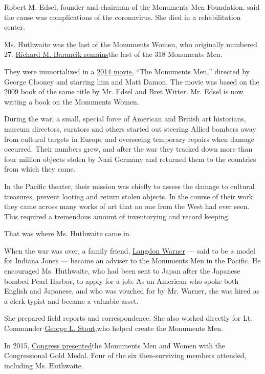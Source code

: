 Robert M. Edsel, founder and chairman of the Monuments Men Foundation,
said the cause was complications of the coronavirus. She died in a
rehabilitation center.

Ms. Huthwaite was the last of the Monuments Women, who originally
numbered 27.
\href{https://www.monumentsmenfoundation.org/barancik-pfc-richard-m}{Richard
M. Barancik remains}the last of the 318 Monuments Men.

They were immortalized in a
\href{https://www.imdb.com/title/tt2177771/}{2014 movie,} ``The
Monuments Men,'' directed by George Clooney and starring him and Matt
Damon. The movie was based on the 2009 book of the same title by Mr.
Edsel and Bret Witter. Mr. Edsel is now writing a book on the Monuments
Women.

During the war, a small, special force of American and British art
historians, museum directors, curators and others started out steering
Allied bombers away from cultural targets in Europe and overseeing
temporary repairs when damage occurred. Their numbers grew, and after
the war they tracked down more than four million objects stolen by Nazi
Germany and returned them to the countries from which they came.

In the Pacific theater, their mission was chiefly to assess the damage
to cultural treasures, prevent looting and return stolen objects. In the
course of their work they came across many works of art that no one from
the West had ever seen. This required a tremendous amount of
inventorying and record keeping.

That was where Ms. Huthwaite came in.

When the war was over, a family friend,
\href{https://www.monumentsmenfoundation.org/warner-langdon}{Langdon
Warner} --- said to be a model for Indiana Jones --- became an adviser
to the Monuments Men in the Pacific. He encouraged Ms. Huthwaite, who
had been sent to Japan after the Japanese bombed Pearl Harbor, to apply
for a job. As an American who spoke both English and Japanese, and who
was vouched for by Mr. Warner, she was hired as a clerk-typist and
became a valuable asset.

She prepared field reports and correspondence. She also worked directly
for Lt. Commander
\href{https://www.monumentsmenfoundation.org/stout-lt-cdr-george-l-usnr}{George
L. Stout,}who helped create the Monuments Men.

In 2015,
\href{https://www.mcclatchydc.com/news/politics-government/congress/article41044539.html}{Congress
presented}the Monuments Men and Women with the Congressional Gold Medal.
Four of the six then-surviving members attended, including Ms.
Huthwaite.

